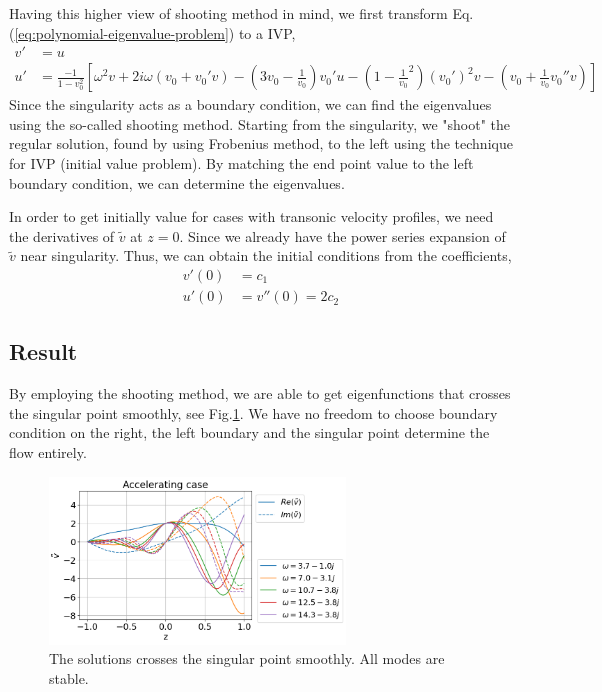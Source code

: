 Having this higher view of shooting method in mind, we first transform Eq.(\ref{eq:polynomial-eigenvalue-problem}) to a IVP,
\begin{align*}
v' &= u\\
u' &= \frac{-1}{1-v_0^2}\left[
    \omega^2v + 2i\omega(v_0+v_0'v) - \left(3v_0 - \frac{1}{v_0}\right)v_0'u - \left(1-\frac{1}{v_0}^2\right)(v_0')^2v - \left(v_0+\frac{1}{v_0}v_0'' v\right)
\right]
\end{align*}
Since the singularity acts as a boundary condition, we can find the eigenvalues using the so-called shooting method. Starting from the singularity, we "shoot" the regular solution, found by using Frobenius method, to the left using the technique for IVP (initial value problem). By matching the end point value to the left boundary condition, we can determine the eigenvalues. 

In order to get initially value for cases with transonic velocity profiles, we need the derivatives of $\tilde{v}$ at $z=0$. Since we already have the power series expansion of $\tilde{v}$ near singularity. Thus, we can obtain the initial conditions from the coefficients,
\begin{align*}
  v'(0) &= c_1 \\
  u'(0) &= v''(0) = 2c_2
\end{align*}

\subsection{Result}
By employing the shooting method, we are able to get eigenfunctions that crosses the singular point smoothly, see Fig.\ref{fig:good-accelerating-v}. We have no freedom to choose boundary condition on the right, the left boundary and the singular point determine the flow entirely.

\begin{figure}[htbp]
  \begin{center}
    \includegraphics[width=0.7\textwidth]{figures/results-accelerating-v.png}
  \end{center}
  \caption{The solutions crosses the singular point smoothly. All modes are stable.}
  \label{fig:good-accelerating-v}
\end{figure}


